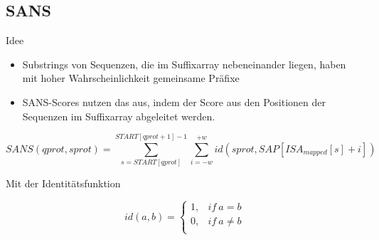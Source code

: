\documentclass[aspectratio=1610]{beamer}
\begin{document}
\subsection{SANS}

\begin{frame}{Idee}
  \begin{itemize}
    \item Substrings von Sequenzen, die im Suffixarray nebeneinander liegen, haben mit hoher Wahrscheinlichkeit gemeinsame Präfixe
    \item  SANS-Scores nutzen das aus, indem der Score aus den Positionen der Sequenzen im Suffixarray abgeleitet werden.
  \end{itemize}
\end{frame}

\begin{frame}
  \begin{equation*}
    SANS(qprot,sprot) = \sum_{s=START[qprot]}^{START[qprot+1]-1} \sum_{i=-w}^{+w} id(sprot,SAP[ISA_{mapped}[s]+i]) 
  \end{equation*}

  Mit der Identitätsfunktion

  \begin{equation*}
    id(a,b)=\begin{cases}
      1, & if~a=b\\
      0, & if~a\ne b\\
    \end{cases}
  \end{equation*}
\end{frame}
\end{document}
